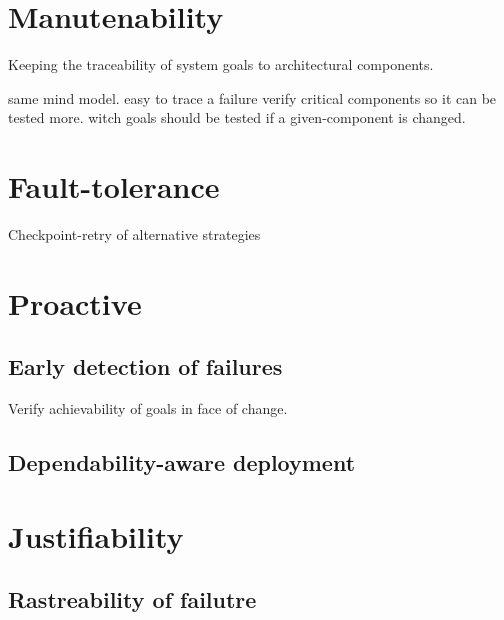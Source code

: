 
\section{Manutenability}

Keeping the traceability of system goals to architectural components.

same mind model.
easy to trace a failure
verify critical components so it can be tested more.
witch goals should be tested if a given-component is changed.

\section{Fault-tolerance}

Checkpoint-retry of alternative strategies


\section{Proactive}

\subsection{Early detection of failures}
Verify achievability of goals in face of change.

\subsection{Dependability-aware deployment}

\section{Justifiability}

\subsection{Rastreability of failutre}
